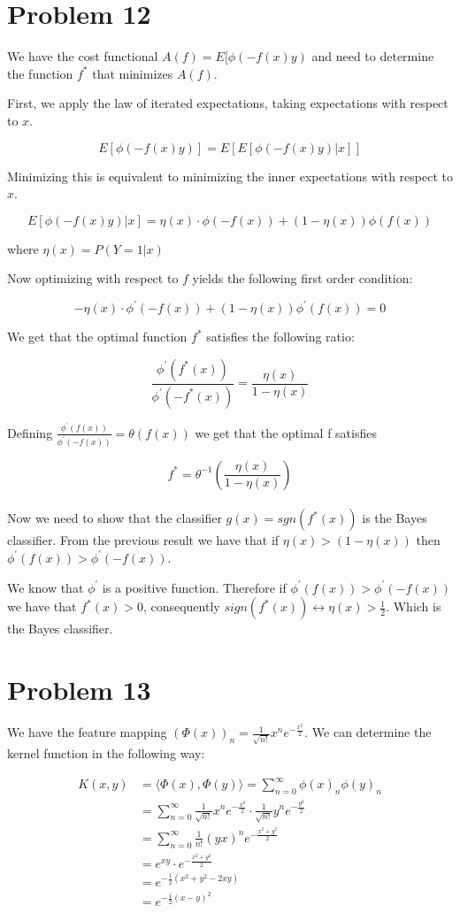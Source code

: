 \documentclass[a4paper, 11pt]{article} %
\begin{document}
\section*{Problem 12} 

We have the cost functional $A(f)=E[\phi(-f(x) y)$ and need to determine the function $f^*$ that minimizes $A(f)$. 

First, we apply the law of iterated expectations, taking expectations with respect to $x$.

$$E[\phi(-f(x) y)]=E[E[\phi(-f(x) y) | x]]$$

Minimizing this is equivalent to minimizing the inner expectations with respect to $x$. 

$$E[\phi(-f(x) y) | x] = \eta(x) \cdot \phi(-f(x))+(1-\eta(x)) \phi(f(x))  $$

where $\eta(x) = P(Y = 1 | x)$

Now optimizing with respect to $f$ yields the following first order condition:

$$-\eta(x) \cdot \phi^{\prime}(-f(x))+(1-\eta(x)) \phi^{\prime}(f(x))=0$$

We get that the optimal function $f^*$ satisfies the following ratio:

$$\frac{\phi^{\prime}(f^*(x))}{\phi^{\prime}(-f^*(x))}=\frac{\eta(x)}{1-\eta(x)}$$

Defining $\frac{\phi^{\prime}(f(x))}{\phi^{\prime}(-f(x))} = \theta(f(x))$ we get that the optimal f satisfies

$$f^* = \theta^{-1}\left(\frac{\eta(x)}{1-\eta(x)} \right)$$
\\
Now we need to show that the classifier $g(x) = sgn(f^*(x))$ is the Bayes classifier. From the previous result we have that if $\eta(x) > (1-\eta(x))$ then $\phi^{\prime}(f(x)) > \phi^{\prime}(-f(x))$. 

We know that $\phi^{\prime}$ is a positive function. Therefore if  $\phi^{\prime}(f(x)) > \phi^{\prime}(-f(x))$ we have that $f^*(x) >0 $, consequently $sign( f^*(x) ) \leftrightarrow  \eta(x) > \frac{1}{2}$. Which is the Bayes classifier.

\section*{Problem 13}

We have the feature mapping $(\Phi(x))_{n}=\frac{1}{\sqrt{n !}} x^{n} e^{-\frac{x^{2}}{2}}$. We can determine the kernel function in the following way:

\begin{align*}
K(x,y) &= \langle\Phi(x), \Phi(y)\rangle =  \sum_{n=0}^{\infty} \phi (x)_n \phi (y)_n \\
&= \sum_{n=0}^\infty \frac{1}{\sqrt{n !}} x^{n} e^{-\frac{x^{2}}{2}} \cdot \frac{1}{\sqrt{n !}} y^{n} e^{-\frac{y^{2}}{2}} \\
&= \sum_{n=0}^\infty \frac{1}{n !}(y  x)^{n} e^{-\frac{x^{2}+y^2}{2}}  \\ 
&= e^{xy} \cdot e^{-\frac{x^2 + y^2}{2}} \\
&= e^{-\frac{1}{2} \left( x^2 + y^2 - 2xy \right)} \\
&= e^{-\frac{1}{2} (x-y)^2}
\end{align*}
\end{document}
